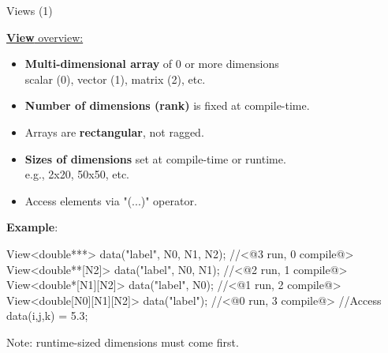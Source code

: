 \begin{frame}[fragile]{Views (1)}

  \ul{\textbf{View} overview:}

  \begin{itemize}
    \item{\textbf{Multi-dimensional array} of 0 or more dimensions \\
          \hspace{20pt}scalar (0), vector (1), matrix (2), etc.}
    \item{\textbf{Number of dimensions (rank)} is fixed at compile-time.}
    \item{Arrays are \textbf{rectangular}, not ragged.}
    \item{\textbf{Sizes of dimensions} set at compile-time or runtime. \\
          \hspace{20pt}e.g., 2x20, 50x50, etc.}
    \item{Access elements via "(...)" operator.}
  \end{itemize}

  \pause
  \vspace{-3pt}

  \textbf{Example}:
  \vspace{-3pt}
  \begin{code}[keywords={double,View}]
View<double***> data("label", N0, N1, N2); //<@3 run, 0 compile@>
View<double**[N2]> data("label", N0, N1);  //<@2 run, 1 compile@>
View<double*[N1][N2]> data("label", N0);   //<@1 run, 2 compile@>
View<double[N0][N1][N2]> data("label");    //<@0 run, 3 compile@>
//Access
data(i,j,k) = 5.3;
  \end{code}

  \vspace{-1pt}
  Note: runtime-sized dimensions must come first.

\end{frame}


